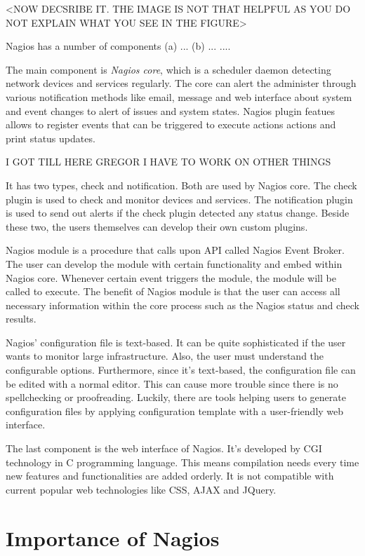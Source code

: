 \documentclass[9pt,twocolumn,twoside]{styles/osajnl}
\begin{document}
<NOW DECSRIBE IT. THE IMAGE IS NOT THAT HELPFUL AS YOU DO NOT EXPLAIN
WHAT YOU SEE IN THE FIGURE>


Nagios has a number of components (a) ... (b) ... ....

The main component is {\em Nagios core}, which is a scheduler daemon
detecting network devices and services regularly. The core can alert
the administer through various notification methods like email,
message and web interface about system and event changes to alert of
issues and system states. Nagios plugin featues allows to register
events that can be triggered to execute actions actions and print
status updates.

I GOT TILL HERE GREGOR I HAVE TO WORK ON OTHER THINGS

It has two types,
check and notification. Both are used by Nagios core. The check plugin
is used to check and monitor devices and services. The notification
plugin is used to send out alerts if the check plugin detected any
status change. Beside these two, the users themselves can develop
their own custom plugins.

Nagios module is a procedure that calls upon API called Nagios Event
Broker. The user can develop the module with certain functionality and
embed within Nagios core. Whenever certain event triggers the module,
the module will be called to execute. The benefit of Nagios module is
that the user can access all necessary information within the core
process such as the Nagios status and check results.

Nagios' configuration file is text-based. It can be quite
sophisticated if the user wants to monitor large infrastructure. Also,
the user must understand the configurable options. Furthermore, since
it's text-based, the configuration file can be edited with a normal
editor. This can cause more trouble since there is no spellchecking or
proofreading. Luckily, there are tools helping users to generate
configuration files by applying configuration template with a
user-friendly web interface.

The last component is the web interface of Nagios. It's developed by
CGI technology in C programming language. This means compilation needs
every time new features and functionalities are added orderly. It is
not compatible with current popular web technologies like CSS, AJAX
and JQuery.

\section{Importance of Nagios}
\end{document}
